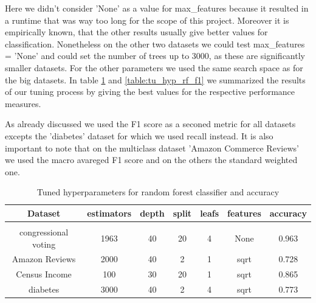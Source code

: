 \documentclass[a4paper,10pt]{article}
\begin{document}
Here we didn't consider 'None' as a value for \textsf{max\_features} because it resulted in a runtime that was way too long for the scope of this project. Moreover it is empirically known, that the other results usually give better values for classification. Nonetheless on the other two datasets we could test \textsf{max\_features} = 'None' and could set the number of trees up to 3000, as these are significantly smaller datasets. For the other parameters we used the same search space as for the big datasets. In table \ref{table:tu_hyp_rf_ac} and \ref{table:tu_hyp_rf_f1} we summarized the results of our tuning process by giving the best values for the respective performance measures.

As already discussed we used the F1 score as a seconed metric for all datasets excepts the 'diabetes' dataset for which we used recall instead. It is also important to note that on the multiclass dataset 'Amazon Commerce Reviews' we used the macro avareged F1 score and on the others the standard weighted one.

\begin{table}[h!]
    \centering
    \begin{tabular}{|c|c|c|c|c|c|c|}
    \hline
    Dataset & \textsf{estimators} & \textsf{depth} & \textsf{split} & \textsf{leafs} & \textsf{features} & accuracy \\
    \hline
    \multicolumn{7}{c}{\vspace{-0.4cm}} \\ %
    \hline
    congressional voting & 1963 & 40 & 20 & 4 & None & 0.963 \\%
    \hline
    Amazon Reviews & 2000 & 40 & 2 & 1 & sqrt & 0.728 \\%
    \hline
    Census Income & 100 & 30 & 20 & 1 & sqrt & 0.865 \\%
    \hline
    diabetes & 3000 & 40 & 2 & 4 & sqrt & 0.773 \\%
    \hline
    \end{tabular}
    \caption{Tuned hyperparameters for random forest classifier and accuracy} 
    \label{table:tu_hyp_rf_ac}
    \end{table}
\end{document}
